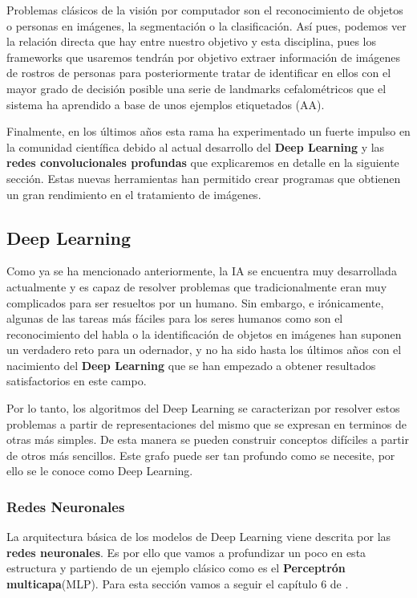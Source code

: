         \medskip
        
        \noindent Problemas clásicos de la visión por computador son el reconocimiento de objetos o personas en imágenes, la segmentación o la clasificación. Así pues, podemos ver la relación directa que hay entre nuestro objetivo y esta disciplina, pues los frameworks que usaremos tendrán por objetivo extraer información de imágenes de rostros de personas para posteriormente tratar de identificar en ellos con el mayor grado de decisión posible una serie de landmarks cefalométricos que el sistema ha aprendido a base de unos ejemplos etiquetados (AA).

        \medskip

        \noindent Finalmente, en los últimos años esta rama ha experimentado un fuerte impulso en la comunidad científica debido al actual desarrollo del \textbf{Deep Learning} y las \textbf{redes convolucionales profundas} que explicaremos en detalle en la siguiente sección. Estas nuevas herramientas han permitido crear programas que obtienen un gran rendimiento en el tratamiento de imágenes.

    \subsection{Deep Learning}
        Como ya se ha mencionado anteriormente, la IA se encuentra muy desarrollada actualmente y es capaz de resolver problemas que tradicionalmente eran muy complicados para ser resueltos por un humano. Sin embargo, e irónicamente, algunas de las tareas más fáciles para los seres humanos como son el reconocimiento del habla o la identificación de objetos en imágenes han suponen un verdadero reto para un odernador, y no ha sido hasta los últimos años con el nacimiento del \textbf{Deep Learning} que se han empezado a obtener resultados satisfactorios en este campo.

        \medskip
        
        \noindent Por lo tanto, los algoritmos del Deep Learning se caracterizan por resolver estos problemas a partir de representaciones del mismo que se expresan en terminos de otras más simples. De esta manera se pueden construir conceptos difíciles a partir de otros más sencillos. Este grafo puede ser tan profundo como se necesite, por ello se le conoce como Deep Learning.

        \subsubsection{Redes Neuronales} \label{sub:redes_neuronales}
            La arquitectura básica de los modelos de Deep Learning viene descrita por las \textbf{redes neuronales}. Es por ello que vamos a profundizar un poco en esta estructura y partiendo de un ejemplo clásico como es el \textbf{Perceptrón multicapa}(MLP). Para esta sección vamos a seguir el capítulo 6 de \cite{Goodfellow-et-al-2016}.

